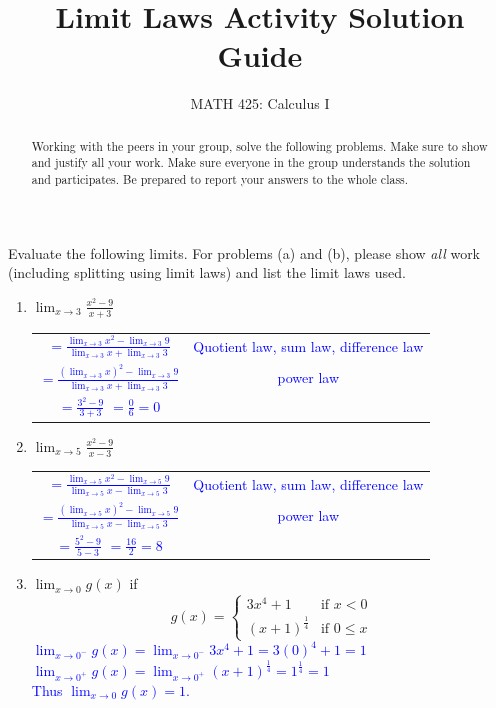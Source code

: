 \documentclass{ximera}
\title{Limit Laws Activity Solution Guide}
\author{MATH 425: Calculus I}
\begin{document}
\begin{abstract}
    Working with the peers in your group, solve the following problems. Make sure to show and justify all your work. Make sure everyone in the group understands the solution and participates. Be prepared to report your answers to the whole class. 
\end{abstract}
\maketitle


\begin{exercise}
    Evaluate the following limits.  For problems (a) and (b), please show \textit{all} work (including splitting using limit laws) and list the limit laws used.
  \begin{enumerate}
 

   \item $\displaystyle \lim_{x\rightarrow 3} \frac{x^2-9}{x+3}$\\ 
     \textcolor{blue}{\begin{tabular}{c|c}
       $\displaystyle=\frac{\lim_{x\rightarrow 3} x^2-\lim_{x\rightarrow 3}9}{\lim_{x\rightarrow3}x+\lim_{x\rightarrow 3}3}$  & Quotient law, sum law, difference law  \\
        $=\displaystyle \frac{(\lim_{x\rightarrow 3} x)^2-\lim_{x\rightarrow 3}9}{\lim_{x\rightarrow3}x+\lim_{x\rightarrow 3}3}$ & power law\\
        $=\frac{3^2-9}{3+3}$
        $=\frac{0}{6}=0$ & 
    \end{tabular}}
    \item $\displaystyle \lim_{x\rightarrow 5} \frac{x^2-9}{x-3}$ \\
    \textcolor{blue}{\begin{tabular}{c|c}
       $\displaystyle=\frac{\lim_{x\rightarrow 5} x^2-\lim_{x\rightarrow 5}9}{\lim_{x\rightarrow 5}x-\lim_{x\rightarrow 5}3}$  & Quotient law, sum law, difference law  \\
        $=\displaystyle \frac{(\lim_{x\rightarrow 5} x)^2-\lim_{x\rightarrow 5}9}{\lim_{x\rightarrow5}x-\lim_{x\rightarrow 5}3}$ & power law\\
        $=\frac{5^2-9}{5-3}$
        $=\frac{16}{2}=8$ & 
        \end{tabular}}
    \item $\displaystyle \lim_{x\rightarrow 0}g(x)$ if \[g(x)= 
    \begin{cases}
    3x^4+1 &\text{if }x<0\\
    (x+1)^{\frac14} &\text{if }0\leq x
    \end{cases}\]
    \textcolor{blue}{ $\displaystyle \lim_{x\rightarrow 0^-}g(x)=\lim_{x\rightarrow 0^-} 3x^4+1=3(0)^4+1=1$\\
    $\displaystyle \lim_{x\rightarrow 0^+}g(x)=\lim_{x\rightarrow 0^+}(x+1)^{\frac14}=1^{\frac14}=1$\\
    Thus $\displaystyle \lim_{x\rightarrow 0} g(x)=1$.}
  \end{enumerate}
\end{exercise}
\end{document}
